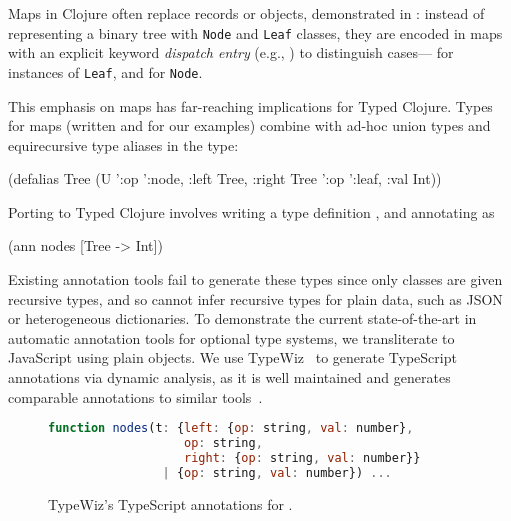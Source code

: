Maps in Clojure often replace records or objects,
demonstrated in :
instead of representing a binary tree with \texttt{Node} and \texttt{Leaf} classes,
they are encoded in maps
with an explicit keyword \emph{dispatch entry} (e.g., ) to distinguish
cases--- for instances of \texttt{Leaf}, and
 for \texttt{Node}.

This emphasis on maps has far-reaching
implications for
Typed Clojure. %
Types for maps (written
 and
for our examples) combine with
ad-hoc union types and
equirecursive type aliases
in the type:

\begin{cljlisting}
(defalias Tree
  (U '{:op ':node, :left Tree, :right Tree}
     '{:op ':leaf, :val Int}))
\end{cljlisting}

Porting  to Typed Clojure involves writing a type definition
, and annotating  as
\begin{cljlisting}
(ann nodes [Tree -> Int])
\end{cljlisting}
Existing annotation tools fail to
generate these types since
only classes are given
recursive types,
and so cannot infer recursive types for plain data,
such as JSON or heterogeneous dictionaries.
%
To demonstrate the current state-of-the-art in automatic annotation tools for optional type systems,
we transliterate  to JavaScript using plain objects. 
We use TypeWiz~\cite{typewiz} to generate TypeScript annotations via dynamic analysis,
as it is well maintained and generates comparable annotations
to similar tools~\cite{saftoiu2010jstrace,pyannotate,typette18,An10dynamicinference,pytype,kristensen2017inference}.

\begin{figure}
\begin{lstlisting}[language=JavaScript]
function nodes(t: {left: {op: string, val: number},
                   op: string,
                   right: {op: string, val: number}}
                | {op: string, val: number}) ...
\end{lstlisting}
\caption{TypeWiz's TypeScript annotations for .}
\label{fig:infer:typewiz}
\end{figure}


